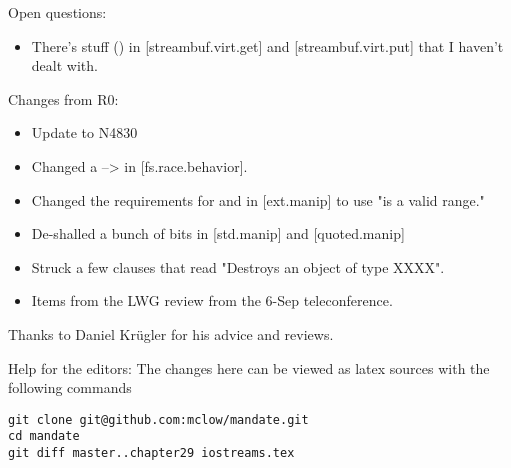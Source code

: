 Open questions:
\begin{itemize}
\item{There's stuff (\requires) in [streambuf.virt.get] and [streambuf.virt.put] that I haven't dealt with.}
\end{itemize}


Changes from R0:
\begin{itemize}
\item{Update to N4830}
\item{Changed a \requires --> \expects in [fs.race.behavior].}
\item{Changed the requirements for  and  in [ext.manip] to use "is a valid range."}
\item{De-shalled a bunch of bits in [std.manip] and [quoted.manip]}
\item{Struck a few clauses that read "Destroys an object of type XXXX".}
\item{Items from the LWG review from the 6-Sep teleconference.}
\end{itemize}

Thanks to Daniel Krügler for his advice and reviews.

\vfill
Help for the editors: The changes here can be viewed as latex sources with the following commands
\begin{verbatim}
git clone git@github.com:mclow/mandate.git
cd mandate
git diff master..chapter29 iostreams.tex
\end{verbatim}
